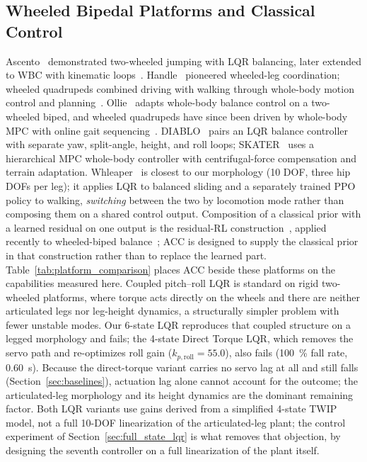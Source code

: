 \documentclass[a4paper,fleqn]{cas-dc}
\begin{document}
\subsection{Wheeled Bipedal Platforms and Classical Control}
\label{sec:related_pos}
Ascento~\cite{klemm2019ascento} demonstrated two-wheeled jumping with LQR balancing, later extended to WBC with kinematic loops~\cite{klemm2020lqrwbc}.
Handle~\cite{boston_dynamics_handle2017} pioneered wheeled-leg coordination; wheeled quadrupeds combined driving with walking through whole-body motion control and planning~\cite{bjelonic2019wheeled}.
Ollie~\cite{zhang2022ollie} adapts whole-body balance control on a two-wheeled biped, and wheeled quadrupeds have since been driven by whole-body MPC with online gait sequencing~\cite{bjelonic2021mpc}. DIABLO~\cite{diablo2024} pairs an LQR balance controller with separate yaw, split-angle, height, and roll loops; SKATER~\cite{skater2024} uses a hierarchical MPC whole-body controller with centrifugal-force compensation and terrain adaptation. Whleaper~\cite{whleaper2024} is closest to our morphology (10 DOF, three hip DOFs per leg); it applies LQR to balanced sliding and a separately trained PPO policy to walking, \emph{switching} between the two by locomotion mode rather than composing them on a shared control output. Composition of a classical prior with a learned residual on one output is the residual-RL construction~\cite{johannink2019residual,silver2018residual}, applied recently to wheeled-biped balance~\cite{zhang2025residualwbr}; ACC is designed to supply the classical prior in that construction rather than to replace the learned part. Table~\ref{tab:platform_comparison} places ACC beside these platforms on the capabilities measured here.
Coupled pitch--roll LQR is standard on rigid two-wheeled platforms, where torque acts directly on the wheels and there are neither articulated legs nor leg-height dynamics, a structurally simpler problem with fewer unstable modes. Our 6-state LQR reproduces that coupled structure on a legged morphology and fails; the 4-state Direct Torque LQR, which removes the servo path and re-optimizes roll gain ($k_{p,\text{roll}}{=}55.0$), also fails (\SI{100}{\percent} fall rate, \SI{0.60}{s}). Because the direct-torque variant carries no servo lag at all and still falls (Section~\ref{sec:baselines}), actuation lag alone cannot account for the outcome; the articulated-leg morphology and its height dynamics are the dominant remaining factor. Both LQR variants use gains derived from a simplified 4-state TWIP model, not a full 10-DOF linearization of the articulated-leg plant; the control experiment of Section~\ref{sec:full_state_lqr} is what removes that objection, by designing the seventh controller on a full linearization of the plant itself.
\end{document}
